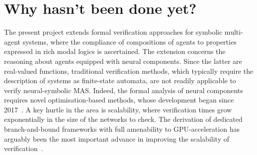 \documentclass[11pt]{article}
\begin{document}





\section{Why hasn't been done yet?}



The present project extends formal verification approaches
for symbolic multi-agent systems, where the compliance of
compositions of agents to properties expressed in rich modal
logics is ascertained. The extension concerns the reasoning
about agents equipped with neural components. Since the
latter are real-valued functions, traditional verification
methods, which typically require the description of systems
as finite-state automata, are not readily applicable to
verify neural-symbolic MAS. Indeed, the formal analysis of
neural components requires novel optimisation-based methods,
whose development began since 2017~\cite{Katz+17}. A key
hurtle in the area is scalability, where verification times
grow exponentially in the size of the networks to check. The
derivation of dedicated branch-and-bound frameworks with
full amenability to GPU-acceleration has arguably been the
most important advance in improving the scalability of
verification~\cite{}. 
\end{document}
